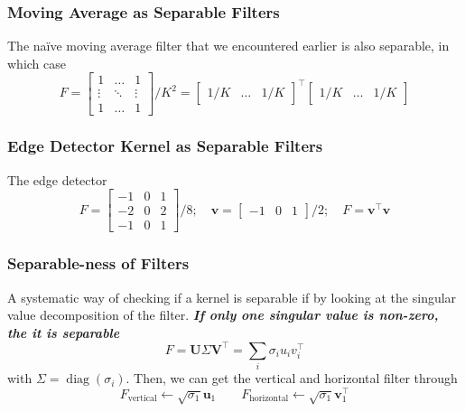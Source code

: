\documentclass[11pt]{article}
\newcommand{\bv}{\mathbf{v}}
\begin{document}
\subsubsection{Moving Average as Separable Filters}
The na\"ive moving average filter that we encountered earlier is also separable, in which case
\begin{equation}
	F = \begin{bmatrix}
		1 & \hdots & 1 \\
		\vdots & \ddots & \vdots \\
		1 & \hdots & 1
	\end{bmatrix} / K^2 = \begin{bmatrix}
		1/K & \dots & 1/K
	\end{bmatrix}^\top  \begin{bmatrix}
		1/K & \dots & 1/K
	\end{bmatrix}
\end{equation}

\subsubsection{Edge Detector Kernel as Separable Filters}
The edge detector 
\begin{equation}
	F = \begin{bmatrix}
		-1 & 0 & 1 \\
		-2 & 0 & 2 \\
		-1 & 0 & 1
	\end{bmatrix} / 8; \quad \bv = \begin{bmatrix}
		-1 & 0 & 1
	\end{bmatrix} / 2; \quad F = \bv^\top \bv
\end{equation}

\subsubsection{Separable-ness of Filters}
A systematic way of checking if a kernel is separable if by looking at the singular value decomposition of the filter. \textit{\textbf{If only one singular value is non-zero, the it is separable}}
\begin{equation}
	F=\mathbf{U} \Sigma \mathbf{V}^{\top}=\sum_{i} \sigma_{i} u_{i} v_{i}^{\top}
\end{equation}
with $\Sigma=\operatorname{diag}\left(\sigma_{i}\right)$. Then, we can get the vertical and horizontal filter through
\begin{equation}
	F_\text{vertical} \gets \sqrt{\sigma_{1}} \mathbf{u}_{1} \quad\quad F_\text{horizontal} \gets \sqrt{\sigma_{1}} \mathbf{v}_{1}^{\top }
\end{equation}
 
\end{document}
